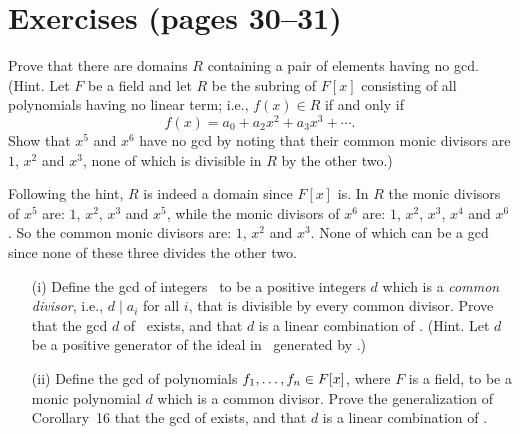 \section{Exercises (pages 30--31)}

\begin{myenumerate}

\item
\begin{excopy}
Prove that there are domains $R$ containing a pair of elements
having no gcd.
(Hint. Let $F$ be a field and let $R$ be the subring of \(F[x]\)
consisting of all polynomials having no linear term;
i.e., \(f(x)\in R\) if and only if
\[f(x)=a_0+a_2x^2+a_3x^3+\cdots.\]
Show that \(x^5\) and \(x^6\) have no gcd by noting that their
common monic divisors are $1$, \(x^2\) and \(x^3\), none of which is divisible
in $R$ by the other two.)
\end{excopy}

Following the hint, $R$ is indeed a domain since \(F[x]\) is.
In $R$ the monic divisors of \(x^5\) are:
$1$, \(x^2\), \(x^3\) and \(x^5\),
while the monic divisors of \(x^6\) are:
$1$, \(x^2\), \(x^3\), \(x^4\) and \(x^6\).
So the common monic divisors are: $1$, \(x^2\) and \(x^3\).
None of which can be a gcd since none of these three divides
the other two.

\item
\begin{excopy}
\begin{itemize}
 \item[(i)]
   Define the gcd of integers \seqan\ to be a positive integers $d$
   which is a
   \emph{common divisor},
   i.e., \(d\mid a_i\) for all $i$, that is divisible by every common divisor.
   Prove that the gcd $d$ of \seqan\ exists, and that $d$ is a linear
   combination of \seqan. (Hint. Let $d$ be a positive generator of the
   ideal in \Z\  generated by \seqan.)
 \item[(ii)]
   Define the gcd of polynomials \(f_1,\ldots,f_{n}\in F[x]\), where $F$ is a field,
   to be a monic polynomial $d$ which is a common divisor.
   Prove the generalization of Corollary~16 that the gcd of 
   exists, and that $d$ is a linear combination of .
\end{itemize}
\end{excopy}



\end{myenumerate}
